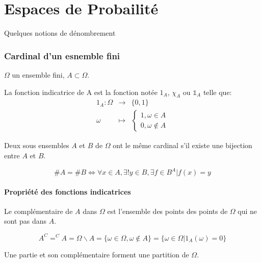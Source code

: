 \part{Espaces de Probailité}
  Quelques notions de dénombrement
  \section{Cardinal d'un esnemble fini}
  $\Omega$ un ensemble fini, $A\subset\Omega$.
  \begin{definition}
    La fonction indicatrice de A est la fonction notée $1_A$, $\chi_A$ ou
    $\mathbb{1}_A$ telle que:
    \begin{eqnarray*}
      1_A : \Omega &\rightarrow& \{0, 1\}\\
            \omega &\mapsto& \begin{cases}
                            1, \omega\in A\\
                            0, \omega\notin A
                          \end{cases}
    \end{eqnarray*}
  \end{definition}

  \begin{proposition}
    Deux sous ensembles $A$ et $B$ de $\Omega$ ont le même cardinal s'il existe
    une bijection entre $A$ et $B$.

    \[\# A = \# B \iff \forall x \in A, \exists ! y \in B, \exists f\in B^A | f(x)=y\]

  \end{proposition}

  \subsection{Propriété des fonctions indicatrices}
  \label{sub:Propriété des fonctions indicatrices}
    \begin{definition}
      Le complémentaire de $A$ dans $\Omega$ est l'ensemble des points des
      points de $\Omega$ qui ne sont pas dans $A$.

      \[A^C = ^CA = \Omega\backslash A = \{\omega\in\Omega, \omega\notin A\}
                                       = \{\omega\in\Omega|1_A(\omega)=0\}
      \]

    \end{definition}

    Une partie et son complémentaire forment une partition de $\Omega$.

